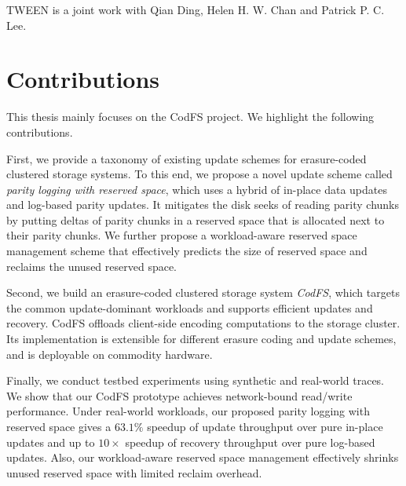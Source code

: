 TWEEN is a joint work with Qian Ding, Helen H. W. Chan and Patrick P. C. Lee.

\section{Contributions}

This thesis mainly focuses on the CodFS project. We highlight the following
contributions.

First, we provide a taxonomy of existing update schemes for
erasure-coded clustered storage systems.  To this end, we propose a novel
update scheme called {\em parity logging with reserved space}, which
uses a hybrid of in-place data updates and log-based parity updates.  It
mitigates the disk seeks of reading parity chunks by putting deltas of parity
chunks in a reserved space that is allocated next to their parity chunks.  We
further propose a workload-aware reserved space management scheme that
effectively predicts the size of reserved space and reclaims the unused
reserved space. 

Second, we build an erasure-coded clustered storage system {\em CodFS}, which
targets the common update-dominant workloads and supports efficient updates
and recovery.   CodFS offloads client-side encoding computations to the
storage cluster.  
Its implementation is extensible for different erasure coding and update
schemes, and is deployable on commodity hardware. 

Finally, we conduct testbed experiments using synthetic and real-world traces.
We show that our CodFS prototype achieves network-bound read/write
performance.  Under real-world workloads, our proposed parity logging with
reserved space gives a ${63.1}\%$ speedup of update throughput over pure
in-place updates and up to ${10\times}$ speedup of recovery throughput over
pure log-based updates.  Also, our workload-aware reserved space management
effectively shrinks unused reserved space with limited reclaim overhead. 



